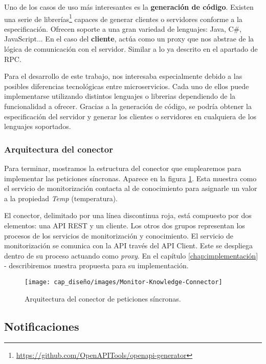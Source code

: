 Uno de los casos de uso más interesantes es la \textbf{generación de código}. Existen una serie de librerías\footnote{\url{https://github.com/OpenAPITools/openapi-generator}} capaces de generar clientes o servidores conforme a la especificación. Ofrecen soporte a una gran variedad de lenguajes: Java, C\#, JavaScript... En el caso del \textbf{cliente}, actúa como un proxy que nos abstrae de la lógica de comunicación con el servidor. Similar a lo ya descrito en el apartado de RPC.

Para el desarrollo de este trabajo, nos interesaba especialmente debido a las posibles diferencias tecnológicas entre microservicios. Cada uno de ellos puede implementarse utilizando distintos lenguajes o librerias dependiendo de la funcionalidad a ofrecer. Gracias a la generación de código, se podría obtener la especificación del servidor y generar los clientes o servidores en cualquiera de los lenguajes soportados.

\subsubsection{Arquitectura del conector}

Para terminar, mostramos la estructura del conector que emplearemos para implementar las peticiones síncronas. Aparece en la figura \ref{fig:monitor-knowledge-connector-architecture}. Esta muestra como el servicio de monitorización contacta al de conocimiento para asignarle un valor a la propiedad \emph{Temp} (temperatura).

El conector, delimitado por una línea discontinua roja, está compuesto por dos elementos: una API REST y un cliente. Los otros dos grupos representan los procesos de los servicios de monitorización y conocimiento. El servicio de monitorización se comunica con la API través del API Client. Este se despliega dentro de su proceso actuando como \emph{proxy}. En el capítulo \ref{chap:implementación} -  describiremos nuestra propuesta para su implementación.

\begin{figure}[htb]
  \centering
  \texttt{[image: cap\_diseño/images/Monitor-Knowledge-Connector]}
  \caption{Arquitectura del conector de peticiones síncronas.}
  \label{fig:monitor-knowledge-connector-architecture}
\end{figure}

\subsection{Notificaciones}
\label{sec:notificaciones}


